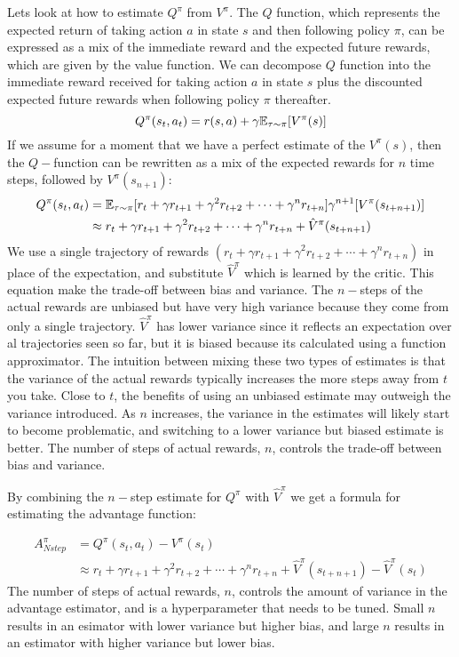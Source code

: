 Lets look at how to estimate $Q^{\pi}$ from $V^{\pi}$. The $Q$ function, which represents the expected return of taking action $a$ in state $s$ and then following policy $\pi$, can be expressed as a mix of the immediate reward and the expected future rewards, which are given by the value function. We can decompose $Q$ function into the immediate reward received for taking action $a$ in state $s$ plus the discounted expected future rewards when following policy $\pi$ thereafter.
$$
Q^{\pi}(s_t,a_t)  = r(s,a) + \gamma \mathbb E_{\tau \sim \pi}[V^{\pi}(s)]
$$
If we assume for a moment that we have a perfect estimate of the $V^{\pi}(s)$, then the $Q-$function can be rewritten as a mix of the expected rewards for $n$ time steps, followed by $V^{\pi}(s_{n+1})$:
\begin{align*}
    Q^{\pi}(s_t,a_t)  &=  \mathbb E_{\tau \sim \pi} [r_t + \gamma r_{t+1} + \gamma^2 r_{t+2} + \cdots + \gamma^n r_{t+n}]  \gamma^{n+1} [V^{\pi}(s_{t+n+1})] \\ 
    & \approx r_t + \gamma r_{t+1} + \gamma^2 r_{t+2} + \cdots + \gamma^n r_{t+n} + \hat{V}^{\pi}(s_{t+n+1})
\end{align*}
We use a single trajectory of rewards $(r_t + \gamma r_{t+1} + \gamma^2 r_{t+2} + \cdots + \gamma^n r_{t+n})$ in place of the expectation, and substitute $\hat{V}^{\pi}$ which is learned by the critic. This equation make the trade-off between bias and variance. The $n-$steps of the actual rewards are unbiased but have very high variance because they come from only a single trajectory. $\hat{V}^{\pi}$ has lower variance since it reflects an expectation over al trajectories seen so far, but it is biased because its calculated using a function approximator. The intuition between mixing these two types of estimates is that the variance of the actual rewards typically increases the more steps away from $t$ you take. Close to $t$, the benefits of using an unbiased estimate may outweigh the variance introduced. As $n$ increases, the variance in the estimates will likely start to become problematic, and switching to a lower variance but biased estimate is better. The number of steps of actual rewards, $n$, controls the trade-off between bias and variance. 

By combining the $n-$step estimate for $Q^{\pi}$ with $\hat{V}^{\pi}$ we get a formula for estimating the advantage function:

\begin{align*}
    A^{\pi}_{Nstep} &= Q^{\pi}(s_t, a_t) - V^{\pi}(s_t) \\
    & \approx r_t + \gamma r_{t+1} + \gamma^2 r_{t+2} + \cdots + \gamma^n r_{t+n} + \hat{V}^{\pi}(s_{t+n+1})
     - \hat{V}^{\pi}(s_t)
\end{align*}
The number of steps of actual rewards, $n$, controls the amount of variance in the advantage estimator, and is a hyperparameter that needs to be tuned. Small $n$ results in an esimator with lower variance but higher bias, and large $n$ results in an estimator with higher variance but lower bias. 


